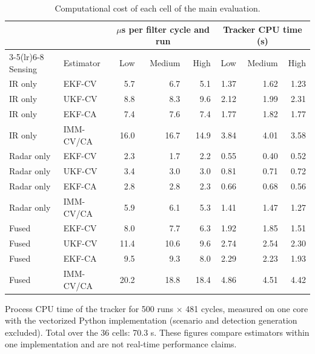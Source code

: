\begin{table}[!htbp]
\caption{Computational cost of each cell of the main evaluation.}
\label{tab:S12}
\centering\footnotesize\setlength{\tabcolsep}{4pt}
\begin{tabular}{@{}llrrrrrr@{}}
\toprule
 & & \multicolumn{3}{c}{$\mu$s per filter cycle and run} & \multicolumn{3}{c}{Tracker CPU time (s)} \\
\cmidrule(lr){3-5}\cmidrule(lr){6-8}
Sensing & Estimator & Low & Medium & High & Low & Medium & High \\
\midrule
IR only & EKF-CV & 5.7 & 6.7 & 5.1 & 1.37 & 1.62 & 1.23 \\
IR only & UKF-CV & 8.8 & 8.3 & 9.6 & 2.12 & 1.99 & 2.31 \\
IR only & EKF-CA & 7.4 & 7.6 & 7.4 & 1.77 & 1.82 & 1.77 \\
IR only & IMM-CV/CA & 16.0 & 16.7 & 14.9 & 3.84 & 4.01 & 3.58 \\
\midrule
Radar only & EKF-CV & 2.3 & 1.7 & 2.2 & 0.55 & 0.40 & 0.52 \\
Radar only & UKF-CV & 3.4 & 3.0 & 3.0 & 0.81 & 0.71 & 0.72 \\
Radar only & EKF-CA & 2.8 & 2.8 & 2.3 & 0.66 & 0.68 & 0.56 \\
Radar only & IMM-CV/CA & 5.9 & 6.1 & 5.3 & 1.41 & 1.47 & 1.27 \\
\midrule
Fused & EKF-CV & 8.0 & 7.7 & 6.3 & 1.92 & 1.85 & 1.51 \\
Fused & UKF-CV & 11.4 & 10.6 & 9.6 & 2.74 & 2.54 & 2.30 \\
Fused & EKF-CA & 9.5 & 9.3 & 8.0 & 2.29 & 2.23 & 1.93 \\
Fused & IMM-CV/CA & 20.2 & 18.8 & 18.4 & 4.86 & 4.51 & 4.42 \\
\bottomrule
\end{tabular}

\smallskip
\parbox{\textwidth}{\footnotesize Process CPU time of the tracker for 500 runs $\times$ 481 cycles, measured on one core with the vectorized Python implementation (scenario and detection generation excluded). Total over the 36 cells: 70.3 s. These figures compare estimators within one implementation and are not real-time performance claims.}
\end{table}
